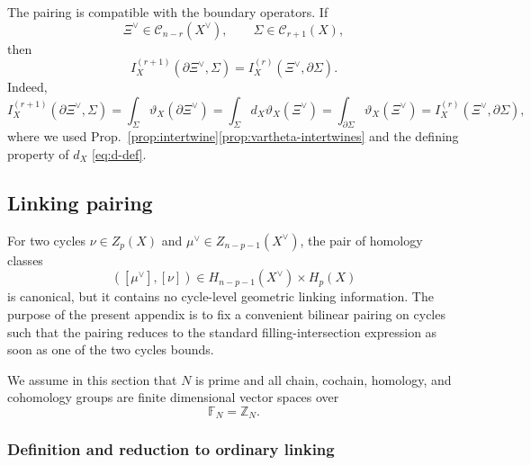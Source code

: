 \documentclass[dvipsnames,a4paper]{article}
\numberwithin{equation}{section}
\theoremstyle{definition}
\theoremstyle{remark}
\begin{document}
The pairing is compatible with the boundary operators. If
\begin{equation}
	\Xi^\vee\in \mathcal C_{n-r}(X^\vee),
	\qquad
	\Sigma\in \mathcal C_{r+1}(X),
\end{equation}
then
\begin{equation}
	I_X^{(r+1)}(\partial \Xi^\vee,\Sigma)
	=
	I_X^{(r)}(\Xi^\vee,\partial \Sigma).
	\label{eq:intersection-Stokes}
\end{equation}
Indeed,
\begin{equation}
	I_X^{(r+1)}(\partial \Xi^\vee,\Sigma)
	=
	\int_\Sigma \vartheta_X(\partial \Xi^\vee)
	=
	\int_\Sigma d_X\vartheta_X(\Xi^\vee)
	=
	\int_{\partial\Sigma}\vartheta_X(\Xi^\vee)
	=
	I_X^{(r)}(\Xi^\vee,\partial\Sigma),
\end{equation}
where we used Prop.~\ref{prop:intertwine}\ref{prop:vartheta-intertwines} and the defining property of \(d_X\) \eqref{eq:d-def}.







\subsection{Linking pairing}
\label{app:linking}

For two cycles $\nu\in Z_p(X)$ and $\mu^\vee\in Z_{n-p-1}(X^\vee)$,
the pair of homology classes
\begin{equation}
	([\mu^\vee],[\nu])\in H_{n-p-1}(X^\vee)\times H_p(X)
\end{equation}
is canonical, but it contains no cycle-level geometric linking information. The purpose of
the present appendix is to fix a convenient bilinear pairing on cycles such that the pairing reduces to the standard filling-intersection expression as soon as one
of the two cycles bounds.

We assume in this section that $N$ is prime and all chain, cochain, homology, and cohomology groups are finite dimensional vector spaces over 
\begin{equation} 
	\mathbb F_N=\mathbb Z_N.
\end{equation}

\subsubsection{Definition and reduction to ordinary linking}
\end{document}
